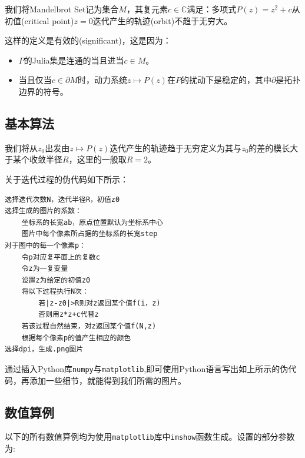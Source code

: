 \documentclass[a4paper]{ctexart}
\begin{document}
我们将Mandelbrot Set记为集合$M$，其复元素$c\in \mathbb{C}$满足：多项式$P(z)=z^2+c$从初值(critical point)$z=0$迭代产生的轨迹(orbit)不趋于无穷大。\cite{mandelbrotsetwiki}

这样的定义是有效的(significant)，这是因为：
\begin{itemize}
	\item $P$的Julia集是连通的当且进当$c\in M$。
	\item 当且仅当$c\in \partial M$时，动力系统$z\mapsto P(z)$在$P$的扰动下是稳定的，其中$\partial$是拓扑边界的符号。
\end{itemize}

\subsection{基本算法}
我们将从$z_0$出发由$z\mapsto P(z)$迭代产生的轨迹趋于无穷定义为其与$z_0$的差的模长大于某个收敛半径$R$，这里的一般取$R=2$。

关于迭代过程的伪代码如下所示：
\begin{lstlisting}
选择迭代次数N，迭代半径R，初值z0
选择生成的图片的系数：
	坐标系的长宽ab，原点位置默认为坐标系中心
	图片中每个像素所占据的坐标系的长宽step
对于图中的每一个像素p：
	令p对应复平面上的复数c
	令z为一复变量
	设置z为给定的初值z0
	将以下过程执行N次：
		若|z-z0|>R则对z返回某个值f(i，z)
		否则用z*z+c代替z
	若该过程自然结束，对z返回某个值f(N,z)
	根据每个像素p的值产生相应的颜色
选择dpi，生成.png图片
\end{lstlisting}

通过插入Python库\verb|numpy|与\verb|matplotlib|,即可使用Python语言写出如上所示的伪代码，再添加一些细节，就能得到我们所需的图片。
\subsection{数值算例}
以下的所有数值算例均为使用\verb|matplotlib|库中\verb|imshow|函数生成。设置的部分参数为:
\end{document}
